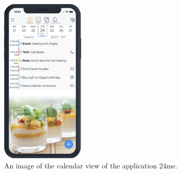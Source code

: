 \begin{figure}[htb]

	\centering
	\includegraphics[width=4cm]{./graphics/24me.png}
	\caption{An image of the calendar view of the application 24me\cite{24me}.}
	\label{fig:24me}
	
\end{figure}